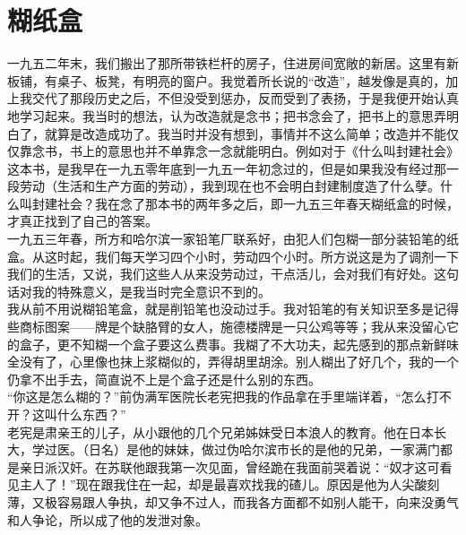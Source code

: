 \fancyhead[RO]{\thepage} %
\fancyhead[LE]{\thepage} %
\chapter*{糊纸盒}
一九五二年末，我们搬出了那所带铁栏杆的房子，住进房间宽敞的新居。这里有新板铺，有桌子、板凳，有明亮的窗户。我觉着所长说的“改造”，越发像是真的，加上我交代了那段历史之后，不但没受到惩办，反而受到了表扬，于是我便开始认真地学习起来。我当时的想法，认为改造就是念书；把书念会了，把书上的意思弄明白了，就算是改造成功了。我当时并没有想到，事情并不这么简单；改造并不能仅仅靠念书，书上的意思也并不单靠念一念就能明白。例如对于《什么叫封建社会》这本书，是我早在一九五零年底到一九五一年初念过的，但是如果我没有经过那一段劳动（生活和生产方面的劳动），我到现在也不会明白封建制度造了什么孽。什么叫封建社会？我在念了那本书的两年多之后，即一九五三年春天糊纸盒的时候，才真正找到了自己的答案。\\

一九五三年春，所方和哈尔滨一家铅笔厂联系好，由犯人们包糊一部分装铅笔的纸盒。从这时起，我们每天学习四个小时，劳动四个小时。所方说这是为了调剂一下我们的生活，又说，我们这些人从来没劳动过，干点活儿，会对我们有好处。这句话对我的特殊意义，是我当时完全意识不到的。\\

我从前不用说糊铅笔盒，就是削铅笔也没动过手。我对铅笔的有关知识至多是记得些商标图案——牌是个缺胳臂的女人，施德楼牌是一只公鸡等等；我从来没留心它的盒子，更不知糊一个盒子要这么费事。我糊了不大功夫，起先感到的那点新鲜味全没有了，心里像也抹上浆糊似的，弄得胡里胡涂。别人糊出了好几个，我的一个仍拿不出手去，简直说不上是个盒子还是什么别的东西。\\

“你这是怎么糊的？”前伪满军医院长老宪把我的作品拿在手里端详着，“怎么打不开？这叫什么东西？”\\

老宪是肃亲王的儿子，从小跟他的几个兄弟姊妹受日本浪人的教育。他在日本长大，学过医。（日名）是他的妹妹，做过伪哈尔滨市长的是他的兄弟，一家满门都是亲日派汉奸。在苏联他跟我第一次见面，曾经跪在我面前哭着说：“奴才这可看见主人了！”现在跟我住在一起，却是最喜欢找我的碴儿。原因是他为人尖酸刻薄，又极容易跟人争执，却又争不过人，而我各方面都不如别人能干，向来没勇气和人争论，所以成了他的发泄对象。\\


